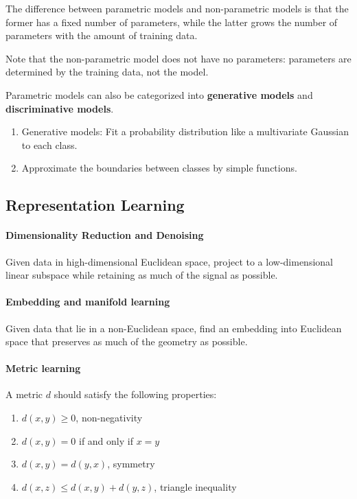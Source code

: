 The difference between parametric models and non-parametric models is that the former 
has a fixed number of parameters, while the latter grows the number of parameters with 
the amount of training data.
\begin{remark}
Note that the non-parametric model does not have no parameters: parameters are determined by the training data, not the model.
\end{remark}

Parametric models can also be categorized into \textbf{generative models} and 
\textbf{discriminative models}.
\begin{enumerate}
\item Generative models: Fit a probability distribution like a multivariate Gaussian to each class.
\item Approximate the boundaries between classes by simple functions.
\end{enumerate}

\subsection{Representation Learning}


\paragraph{Dimensionality Reduction and Denoising}
Given data in high-dimensional Euclidean space, project to a
low-dimensional linear subspace while retaining as much of the
signal as possible. 

\paragraph{Embedding and manifold learning}
Given data that lie in a non-Euclidean space, find an embedding into
Euclidean space that preserves as much of the geometry as possible.

\paragraph{Metric learning}
A metric $d$ should satisfy the following properties:
\begin{enumerate}
	\item $d(x, y) \geq 0$, non-negativity
	\item $d(x, y) = 0$ if and only if $x = y$
	\item $d(x, y) = d(y, x)$, symmetry
	\item $d(x, z) \leq d(x, y) + d(y, z)$, triangle inequality
\end{enumerate}


